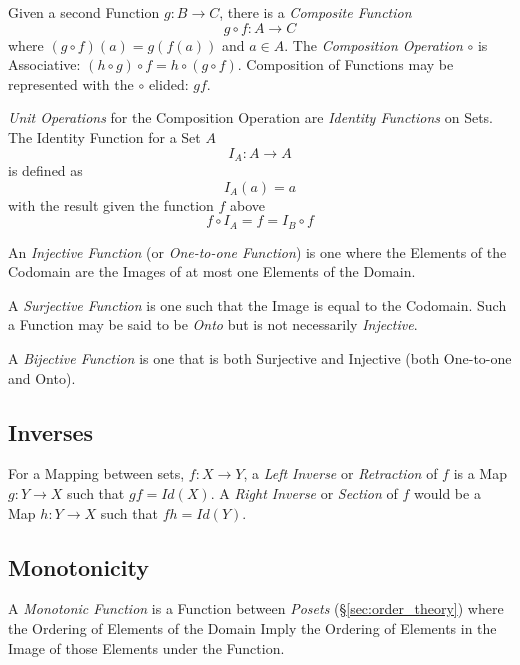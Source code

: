 \documentclass{article}
\begin{document}
Given a second Function $g : B \rightarrow C$, there is a
\emph{Composite Function}
\[
    g \circ f : A \rightarrow C
\]
where $(g \circ f)(a) = g(f(a))$ and $a \in A$. The \emph{Composition
  Operation} $\circ$ is Associative: $(h \circ g) \circ f = h \circ (g
\circ f)$. Composition of Functions may be represented with the
$\circ$ elided: $gf$.

\emph{Unit Operations} for the Composition Operation are
\emph{Identity Functions} on Sets. The Identity Function for a Set $A$
\[
    I_A : A \rightarrow A
\]
is defined as
\[
    I_A(a) = a
\]
with the result given the function $f$ above
\[
    f \circ I_A = f = I_B \circ f
\]

An \emph{Injective Function} (or \emph{One-to-one Function}) is one
where the Elements of the Codomain are the Images of at most one
Elements of the Domain.

A \emph{Surjective Function} is one such that the Image is equal to
the Codomain. Such a Function may be said to be \emph{Onto} but is not
necessarily \emph{Injective}.

A \emph{Bijective Function} is one that is both Surjective and
Injective (both One-to-one and Onto).

\subsection{Inverses}\label{subsec:inverse_functions}

For a Mapping between sets, $f: X \rightarrow Y$, a \emph{Left
  Inverse} or \emph{Retraction} of $f$ is a Map $g: Y \rightarrow X$
such that $gf = Id(X)$. A \emph{Right Inverse} or \emph{Section} of
$f$ would be a Map $h: Y \rightarrow X$ such that $fh = Id(Y)$.

\subsection{Monotonicity}\label{subsec:monotonicity}

A \emph{Monotonic Function} is a Function between \emph{Posets}
(\S\ref{sec:order_theory}) where the Ordering of Elements of the
Domain Imply the Ordering of Elements in the Image of those Elements
under the Function.
\end{document}
